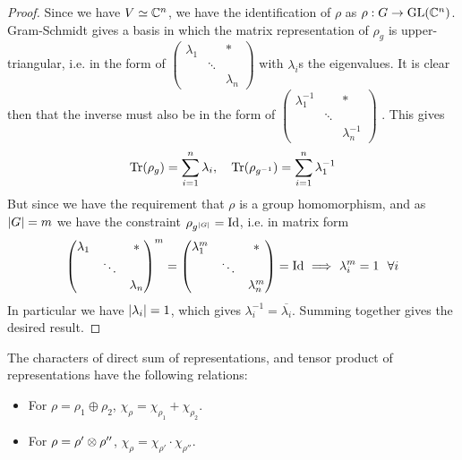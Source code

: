 \begin{proof}
    Since we have $V \simeq \mathbb{C}^n$, we have the identification of $\rho$ as $\rho: G \to \mathrm{GL}(\mathbb{C}^n)$. Gram-Schmidt gives a basis in which the matrix representation of $\rho_g$ is upper-triangular, i.e. in the form of 
    $\left(
    \begin{smallmatrix}
        \lambda_1 & & \ast \\
        & \ddots & \\
        & & \lambda_n
    \end{smallmatrix}\right)
    $
    with $\lambda_i$s the eigenvalues. It is clear then that the inverse must also be in the form of 
    $\left(
    \begin{smallmatrix}
        \lambda_1^{-1} & & \ast \\
        & \ddots & \\
        & & \lambda_n^{-1}
    \end{smallmatrix}\right)
    $
    . This gives
    \[
        \operatorname{Tr}(\rho_g) = \sum_{i = 1}^n \lambda_i, \quad \operatorname{Tr}(\rho_{g^{-1}}) = \sum_{i = 1}^n \lambda_1^{-1}
    \]
    But since we have the requirement that $\rho$ is a group homomorphism, and as $\left|G\right| = m$ we have the constraint $\rho_{g^{\left|G\right|}} = \mathrm{Id}$, i.e. in matrix form
    \[
        \begin{pmatrix}
            \lambda_1 & & \ast \\
            & \ddots & \\
            & & \lambda_n
        \end{pmatrix}^m = 
        \begin{pmatrix}
            \lambda_1^{m} & & \ast \\
            & \ddots & \\
            & & \lambda_n^{m}
        \end{pmatrix} = \mathrm{Id} \ \Longrightarrow\  \lambda_i^m = 1\ \ \forall i
    \]
    In particular we have $\left|\lambda_i\right| = 1$, which gives $\lambda_i^{-1} = \overline{\lambda_i}$. Summing together gives the desired result.
\end{proof}

\begin{proposition}\label{prop: character of direct sum and tensor product}
    The characters of direct sum of representations, and tensor product of representations have the following relations:
    \begin{itemize}
        \item For $\rho = \rho_1 \oplus \rho_2$, $\chi_{\rho} = \chi_{\rho_1} + \chi_{\rho_2}$.
        \item For $\rho = \rho' \otimes \rho''$, $\chi_{\rho} = \chi_{\rho'} \cdot \chi_{\rho''}$.
    \end{itemize}
\end{proposition}

